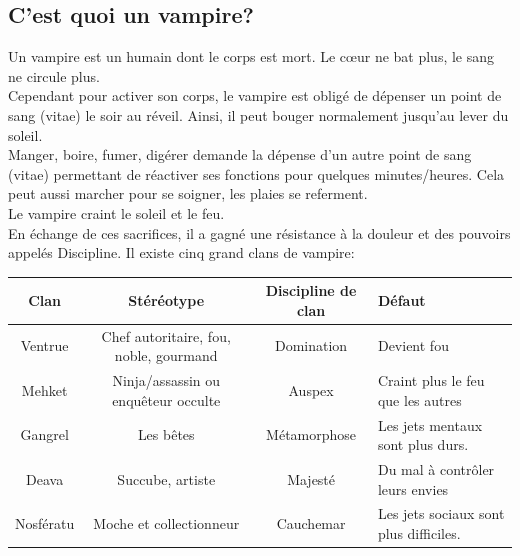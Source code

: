 \documentclass[oneside,12pt]{book}
\begin{document}
\begin{flushleft}
\section{C'est quoi un vampire?}
Un vampire est un humain dont le corps est mort. Le cœur ne bat plus, le sang ne circule plus.\\ 
Cependant pour activer son corps, le vampire est obligé de dépenser un point de sang (vitae) le soir au réveil. Ainsi, il peut bouger normalement jusqu'au lever du soleil.\\ 
Manger, boire, fumer, digérer demande la dépense d'un autre point de sang (vitae) permettant de réactiver ses fonctions pour quelques minutes/heures. Cela peut aussi marcher pour se soigner, les plaies se referment.\\ 
\vspace{0.5cm}
Le vampire craint le soleil et le feu.\\  
En échange de ces sacrifices, il a gagné une résistance à la douleur et des pouvoirs appelés Discipline.
Il existe cinq grand clans de vampire:\\ 

\vspace{0.5cm}
\begin{tabularx}{\linewidth}{|c|c|c|X|}
\hline 
Clan & Stéréotype & Discipline de clan & Défaut \\ 
\hline 
Ventrue & Chef autoritaire, fou, noble, gourmand & Domination & Devient fou \\ 
\hline 
Mehket & Ninja/assassin ou enquêteur occulte & Auspex & Craint plus le feu que les autres \\ 
\hline 
Gangrel & Les bêtes & Métamorphose & Les jets mentaux sont plus durs. \\ 
\hline 
Deava & Succube, artiste & Majesté & Du mal à contrôler leurs envies \\ 
\hline 
Nosfératu & Moche et collectionneur & Cauchemar & Les jets sociaux sont plus difficiles. \\ 
\hline 
\end{tabularx} 
\vspace{0.5cm}


\end{flushleft}
\end{document}
